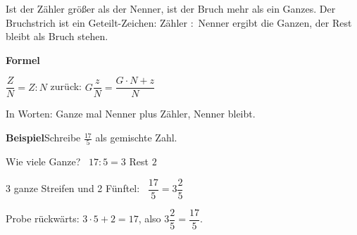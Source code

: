 \documentclass[11pt]{article}
\begin{document}
\noindent Ist der Zähler größer als der Nenner, ist der Bruch mehr als ein Ganzes. Der Bruchstrich ist ein Geteilt-Zeichen: Zähler $:$ Nenner ergibt die Ganzen, der Rest bleibt als Bruch stehen.\par\medskip
\noindent\textbf{Formel}\par\nopagebreak\noindent\hspace*{4mm}\begin{minipage}{\dimexpr\linewidth-4mm\relax}$\dfrac{Z}{N} = Z : N$ \qquad zurück: $G\dfrac{z}{N} = \dfrac{G \cdot N + z}{N}$ \par\smallskip In Worten: Ganze mal Nenner plus Zähler, Nenner bleibt. \par{}\end{minipage}\par\medskip
\noindent\textbf{Beispiel}\quad Schreibe $\frac{17}{5}$ als gemischte Zahl.\par\smallskip
\noindent\begin{minipage}[t]{0.6\linewidth}\vspace{0pt}\par\noindent{}Wie viele Ganze? \ $17 : 5 = 3$ Rest $2$\par\smallskip\par\noindent{}3 ganze Streifen und 2 Fünftel: \ $\dfrac{17}{5} = 3\dfrac{2}{5}$\par\smallskip\par\noindent{}Probe rückwärts: $3 \cdot 5 + 2 = 17$, also $3\dfrac{2}{5} = \dfrac{17}{5}$.\par\smallskip\end{minipage}\hfill
\end{document}
